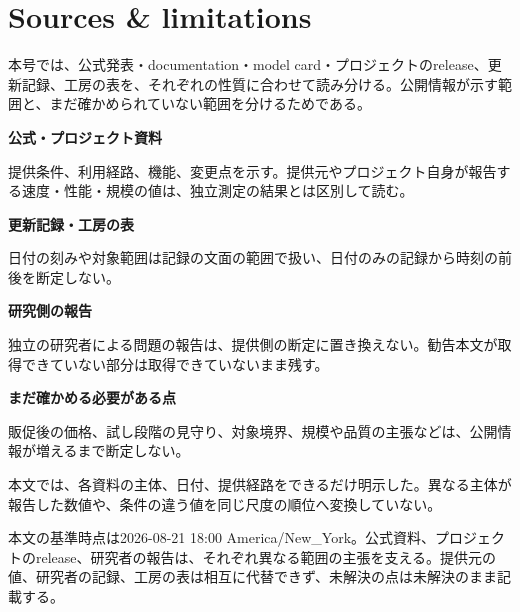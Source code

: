 \section*{Sources \& limitations}

本号では、公式発表・documentation・model card・プロジェクトのrelease、更新記録、工房の表を、それぞれの性質に合わせて読み分ける。公開情報が示す範囲と、まだ確かめられていない範囲を分けるためである。

\begin{tcolorbox}[enhanced,breakable,colback=SurveySoft,colframe=SurveyRule,boxrule=0.4pt,arc=1mm,left=3mm,right=3mm,top=2mm,bottom=2mm]
\textbf{公式・プロジェクト資料}\par
提供条件、利用経路、機能、変更点を示す。提供元やプロジェクト自身が報告する速度・性能・規模の値は、独立測定の結果とは区別して読む。\par\smallskip
\textbf{更新記録・工房の表}\par
日付の刻みや対象範囲は記録の文面の範囲で扱い、日付のみの記録から時刻の前後を断定しない。\par\smallskip
\textbf{研究側の報告}\par
独立の研究者による問題の報告は、提供側の断定に置き換えない。勧告本文が取得できていない部分は取得できていないまま残す。\par\smallskip
\textbf{まだ確かめる必要がある点}\par
販促後の価格、試し段階の見守り、対象境界、規模や品質の主張などは、公開情報が増えるまで断定しない。
\end{tcolorbox}

本文では、各資料の主体、日付、提供経路をできるだけ明示した。異なる主体が報告した数値や、条件の違う値を同じ尺度の順位へ変換していない。

\nocite{w2026w34w34eventc010,w2026w34w34eventc011,w2026w34w34eventc087,w2026w34w34eventc031,w2026w34w34eventgapawsagentcorememoryjson,w2026w34w34eventc104,w2026w34w34eventc105,w2026w34w34eventc007,w2026w34w34eventc012,w2026w34w34eventc019,w2026w34w34eventc100,w2026w34w34eventc101,w2026w34w34eventc047,w2026w34w34eventrefreshkimicodecliv038v037,w2026w34w34eventc099,w2026w34w34eventc102,w2026w34w34eventrefreshopenaireplitgpt56luna,w2026w34w34eventc096,w2026w34w34eventc052,w2026w34w34eventc066,w2026w34w34eventc004,w2026w34w34eventc055,w2026w34w34eventc006,w2026w34w34eventc005,w2026w34w34eventc008,w2026w34w34eventc002,w2026w34w34eventrefreshopenaidefenderswindow,w2026w34w34eventc017,w2026w34w34eventc045,w2026w34w34eventc039,w2026w34w34eventgapalibabakimik3modelstudio,w2026w34w34eventc040,w2026w34w34eventc023,w2026w34w34eventc030,w2026w34w34eventc091,w2026w34w34eventc018,w2026w34w34eventc020,w2026w34w34eventgapalibabawan30modelstudio,w2026w34w34eventc022,w2026w34w34eventc003,w2026w34w34eventc026}

\begin{claimboundary}
本文の基準時点は2026-08-21 18:00 America/New\_York。公式資料、プロジェクトのrelease、研究者の報告は、それぞれ異なる範囲の主張を支える。提供元の値、研究者の記録、工房の表は相互に代替できず、未解決の点は未解決のまま記載する。
\end{claimboundary}
